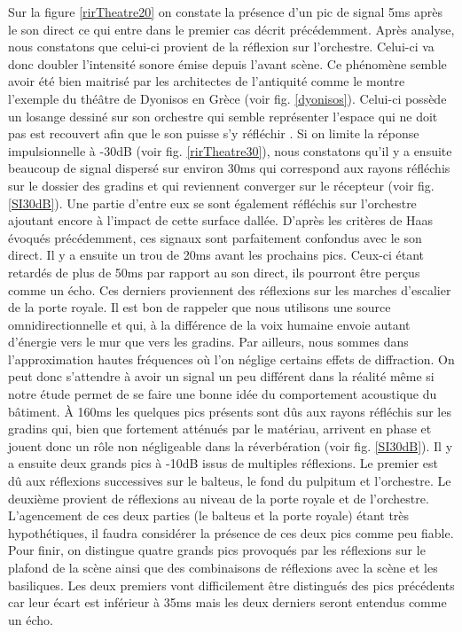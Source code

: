 Sur la figure \ref{rirTheatre20} on constate la présence d'un pic de signal 5ms après le son direct ce qui entre dans le premier cas décrit précédemment. Après analyse, nous constatons que celui-ci provient de la réflexion sur l'orchestre. Celui-ci va donc doubler l'intensité sonore émise depuis l'avant scène. Ce phénomène semble avoir été bien maitrisé par les architectes de l'antiquité comme le montre l'exemple du théâtre de Dyonisos en Grèce (voir fig. \ref{dyonisos}). Celui-ci possède un losange dessiné sur son orchestre qui semble représenter l'espace qui ne doit pas est recouvert afin que le son puisse s'y réfléchir \cite[p.118-120]{canac}. Si on limite la réponse impulsionnelle à -30dB (voir fig. \ref{rirTheatre30}), nous constatons qu'il y a ensuite beaucoup de signal dispersé sur environ 30ms qui correspond aux rayons réfléchis sur le dossier des gradins et qui reviennent converger sur le récepteur (voir fig. \ref{SI30dB}). Une partie d'entre eux se sont également réfléchis sur l'orchestre ajoutant encore à l'impact de cette surface dallée. D'après les critères de Haas évoqués précédemment, ces signaux sont parfaitement confondus avec le son direct. Il y a ensuite un trou de 20ms avant les prochains pics. Ceux-ci étant retardés de plus de 50ms par rapport au son direct, ils pourront être perçus comme un écho. Ces derniers proviennent des réflexions sur les marches d'escalier de la porte royale. Il est bon de rappeler que nous utilisons une source omnidirectionnelle et qui, à la différence de la voix humaine envoie autant d'énergie vers le mur que vers les gradins. Par ailleurs, nous sommes dans l'approximation hautes fréquences où l'on néglige certains effets de diffraction. On peut donc s'attendre à avoir un signal un peu différent dans la réalité même si notre étude permet de se faire une bonne idée du comportement acoustique du bâtiment. À 160ms les quelques pics présents sont dûs aux rayons réfléchis sur les gradins qui, bien que fortement atténués par le matériau, arrivent en phase et jouent donc un rôle non négligeable dans la réverbération (voir fig. \ref{SI30dB}). Il y a ensuite deux grands pics à -10dB issus de multiples réflexions. Le premier est dû aux réflexions successives sur le \gls{balteus}, le fond du \gls{pulpitum} et l'orchestre. Le deuxième provient de réflexions au niveau de la porte royale et de l'orchestre. L'agencement de ces deux parties (le \gls{balteus} et la porte royale) étant très hypothétiques, il faudra considérer la présence de ces deux pics comme peu fiable. Pour finir, on distingue quatre grands pics provoqués par les réflexions sur le plafond de la scène ainsi que des combinaisons de réflexions avec la scène et les basiliques. Les deux premiers vont difficilement être distingués des pics précédents car leur écart est inférieur à 35ms mais les deux derniers seront entendus comme un écho.
